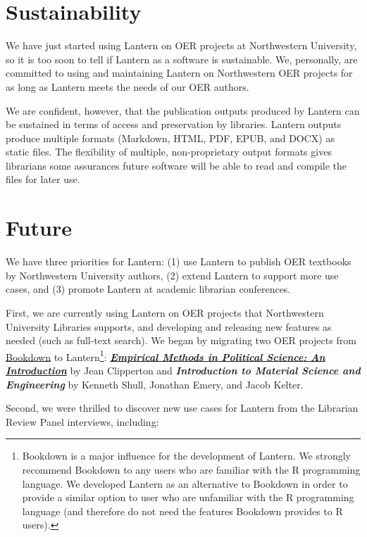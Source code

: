 \documentclass[
  11pt,
  openany]{book}
\begin{document}
\hypertarget{sustainability}{%
\section{Sustainability}\label{sustainability}}

We have just started using Lantern on OER projects at Northwestern University,
so it is too soon to tell if Lantern as a software is sustainable. We,
personally, are committed to using and maintaining Lantern on Northwestern OER
projects for as long as Lantern meets the needs of our OER authors.

We are confident, however, that the publication outputs produced by Lantern
can be sustained in terms of access and preservation by libraries. Lantern
outputs produce multiple formats (Markdown, HTML, PDF, EPUB, and DOCX) as
static files. The flexibility of multiple, non-proprietary output formats
gives librarians some assurances future software will be able to read and
compile the files for later use.

\hypertarget{future}{%
\section{Future}\label{future}}

We have three priorities for Lantern: (1) use Lantern to publish OER textbooks
by Northwestern University authors, (2) extend Lantern to support more use
cases, and (3) promote Lantern at academic librarian conferences.

First, we are currently using Lantern on OER projects that Northwestern
University Libraries supports, and developing and releasing new features as
needed (such as full-text search). We began by migrating two OER projects from
\href{https://bookdown.org/}{Bookdown} to Lantern\footnote{Bookdown is a major
  influence for the development of Lantern. We strongly recommend Bookdown to
  any users who are familiar with the R programming language. We developed
  Lantern as an alternative to Bookdown in order to provide a similar option
  to user who are unfamiliar with the R programming language (and therefore do
  not need the features Bookdown provides to R users).}:
\href{https://emps.northwestern.pub/}{\textbf{\emph{Empirical Methods in
Political Science: An Introduction}}} by Jean Clipperton and
\textbf{\emph{Introduction to Material Science and Engineering}} by Kenneth
Shull, Jonathan Emery, and Jacob Kelter.

Second, we were thrilled to discover new use cases for Lantern from the
Librarian Review Panel interviews, including:
\end{document}
